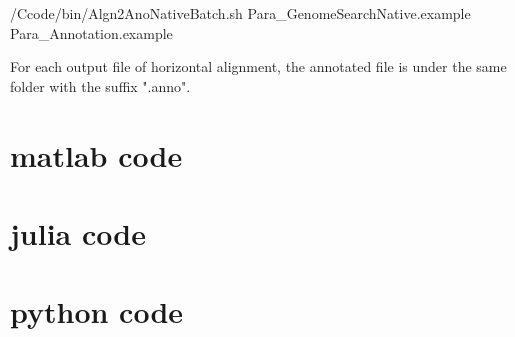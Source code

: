 \documentclass[a4paper]{article}
\begin{document}
\begin{CJK*}{UTF8}{kai}
/Ccode/bin/Algn2AnoNativeBatch.sh Para\_GenomeSearchNative.example Para\_Annotation.example

For each output file of horizontal alignment, the annotated file is under the same folder with the suffix ".anno".

\section{matlab code}

\section{julia code}

\section{python code}

\end{CJK*}
\end{document}
